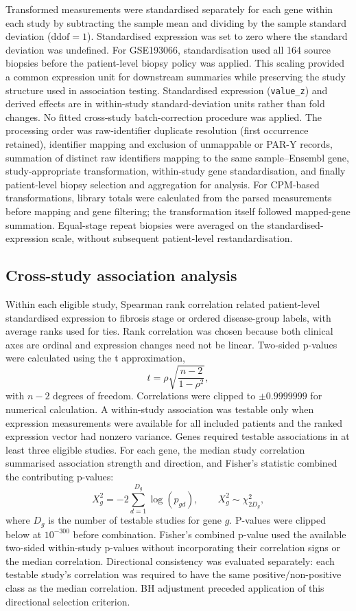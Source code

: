 \documentclass[11pt,a4paper]{article}
\begin{document}
Transformed measurements were standardised separately for each gene within each study by subtracting the sample mean and dividing by the sample standard deviation (\(\mathrm{ddof}=1\)). Standardised expression was set to zero where the standard deviation was undefined. For GSE193066, standardisation used all 164 source biopsies before the patient-level biopsy policy was applied. This scaling provided a common expression unit for downstream summaries while preserving the study structure used in association testing. Standardised expression (\texttt{value\_z}) and derived effects are in within-study standard-deviation units rather than fold changes. No fitted cross-study batch-correction procedure was applied. The processing order was raw-identifier duplicate resolution (first occurrence retained), identifier mapping and exclusion of unmappable or PAR-Y records, summation of distinct raw identifiers mapping to the same sample--Ensembl gene, study-appropriate transformation, within-study gene standardisation, and finally patient-level biopsy selection and aggregation for analysis. For CPM-based transformations, library totals were calculated from the parsed measurements before mapping and gene filtering; the transformation itself followed mapped-gene summation. Equal-stage repeat biopsies were averaged on the standardised-expression scale, without subsequent patient-level restandardisation.

\subsection*{Cross-study association analysis}
Within each eligible study, Spearman rank correlation related patient-level standardised expression to fibrosis stage or ordered disease-group labels, with average ranks used for ties. Rank correlation was chosen because both clinical axes are ordinal and expression changes need not be linear. Two-sided p-values were calculated using the t approximation,
\[
t=\rho\sqrt{\frac{n-2}{1-\rho^2}},
\]
with \(n-2\) degrees of freedom. Correlations were clipped to \(\pm0.9999999\) for numerical calculation. A within-study association was testable only when expression measurements were available for all included patients and the ranked expression vector had nonzero variance. Genes required testable associations in at least three eligible studies. For each gene, the median study correlation summarised association strength and direction, and Fisher's statistic combined the contributing p-values:
\[
X_g^2=-2\sum_{d=1}^{D_g}\log(p_{gd}),\qquad X_g^2\sim\chi^2_{2D_g},
\]
where \(D_g\) is the number of testable studies for gene \(g\). P-values were clipped below at \(10^{-300}\) before combination. Fisher's combined p-value used the available two-sided within-study p-values without incorporating their correlation signs or the median correlation. Directional consistency was evaluated separately: each testable study's correlation was required to have the same positive/non-positive class as the median correlation. BH adjustment preceded application of this directional selection criterion.
\end{document}

